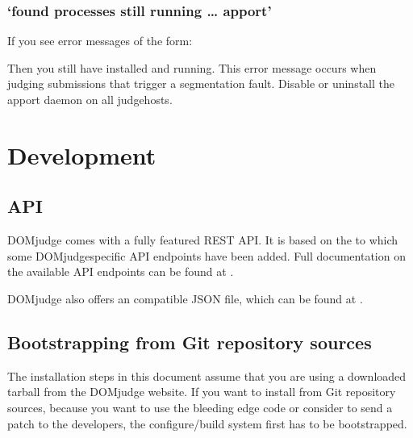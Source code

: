 \documentclass[a4paper,10pt,english,openany]{sphinxmanual}
\begin{document}
\subsubsection{‘found processes still running … apport’}
\label{\detokenize{judging:found-processes-still-running-apport}}
\sphinxAtStartPar
If you see error messages of the form:

\begin{sphinxVerbatim}[commandchars=\\\{\}]
        
 
\end{sphinxVerbatim}

\sphinxAtStartPar
Then you still have  installed and running. This error message occurs when
judging submissions that trigger a segmentation fault. Disable or uninstall the apport
daemon on all judgehosts.

\sphinxstepscope


\section{Development}
\label{\detokenize{develop:development}}\label{\detokenize{develop::doc}}

\subsection{API}
\label{\detokenize{develop:api}}\label{\detokenize{develop:id1}}
\sphinxAtStartPar
DOMjudge comes with a fully featured REST API. It is based on the
to which some DOMjudge\sphinxhyphen{}specific API endpoints have been added. Full documentation
on the available API endpoints can be found at
.

\sphinxAtStartPar
DOMjudge also offers an 
compatible JSON file, which can be found at
.


\subsection{Bootstrapping from Git repository sources}
\label{\detokenize{develop:bootstrapping-from-git-repository-sources}}\label{\detokenize{develop:bootstrap}}
\sphinxAtStartPar
The installation steps in this document assume that you are using a
downloaded tarball from the DOMjudge website. If you want to install
from Git repository sources, because you want to use the bleeding edge
code or consider to send a patch to the developers, the
configure/build system first has to be bootstrapped.
\end{document}
